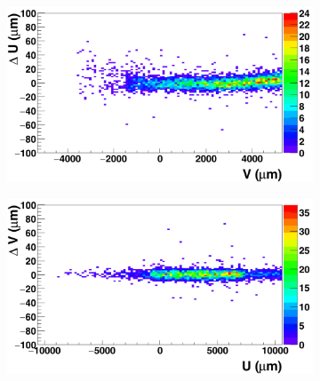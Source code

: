       \begin{figure}[!h]
        \centering
        \begin{subfigure}[t]{0.45\textwidth}
        \centering
          \includegraphics[width = 1.2\textwidth]{Pictures/deformation/deltaUV_8_corrected1.png}
          \caption{}
          \label{fig:scatterDUV_corrected_front}
        \end{subfigure}
        \hfill
        \begin{subfigure}[t]{0.45\textwidth}
          \centering
          \includegraphics[width = 1.2\textwidth]{Pictures/deformation/deltaVU_8_corrected1.png}
          \caption{}
          \label{fig:scatterDVU_corrected}
        \end{subfigure}


\end{figure}

